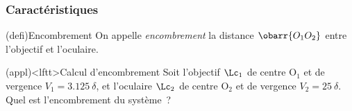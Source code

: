 \documentclass[../../main/main.tex]{subfiles}
\begin{document}
\subsubsection{Caractéristiques}

\begin{tcb*}[label=def:encombrement](defi){Encombrement}
	On appelle \textit{encombrement} la distance $\obarr{O_1O_2}$ entre
	l'objectif et l'oculaire.
\end{tcb*}
\begin{tcb*}[label=exem:encombrement](appl)<lftt>{Calcul d'encombrement}
	Soit l'objectif $\Lc_1$ de centre O$_1$ et de vergence $V_1 =
		\SI{3.125}{\delta}$, et l'oculaire $\Lc_2$ de centre O$_2$ et de
	vergence $V_2 = \SI{25}{\delta}$. Quel est l'encombrement du système~?
	\tcblower
	\begin{isd}
		\vspace{-15pt}
		\begin{center}
		\end{center}
		\vspace{-1cm}
		\tcblower
		\vspace{-15pt}
		\vspace{-1cm}
	\end{isd}
\end{tcb*}
\end{document}
